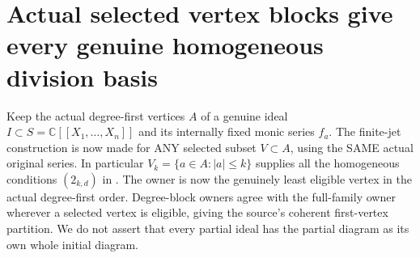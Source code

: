 \section{Actual selected vertex blocks give every genuine homogeneous division basis}

Keep the actual degree-first vertices $A$ of a genuine ideal
$I\subset S=\mathbb C[[X_1,\ldots,X_n]]$ and its internally fixed
monic series $f_a$. The finite-jet construction is now made for ANY
selected subset $V\subset A$, using the SAME actual original series.
In particular $V_k=\{a\in A:|a|\le k\}$ supplies all the homogeneous
conditions $(2_{k,d})$ in
\cite[\S7, (7.2)(2) and Lemma~7.7, pp.~262--264]{bierstone-milman97-invent-math}.
The owner is now the genuinely least eligible vertex in the actual
degree-first order. Degree-block owners agree with the full-family owner
wherever a selected vertex is eligible, giving the source's coherent
first-vertex partition. We do not assert that every partial ideal has
the partial diagram as its own whole initial diagram.

